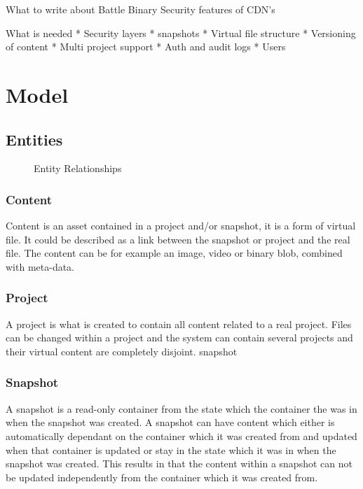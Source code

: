 \documentclass[a4paper,12pt]{article}
\begin{document}
What to write about
Battle Binary
Security features of CDN's

What is needed
* Security layers
* snapshots
* Virtual file structure
* Versioning of content
* Multi project support
* Auth and audit logs
* Users
\newpage 
\section{Model}
\subsection{Entities}
\begin{figure}[htp] 
    \caption{Entity Relationships}
    \label{fig:relation}
\end{figure}

\subsubsection{Content}
Content is an asset contained in a project and/or snapshot, it is a form of virtual file.
It could be described as a link between the snapshot or project and the real file. 
The content can be for example an image, video or binary blob, combined with meta-data.

\subsubsection{Project}
A project is what is created to contain all content related to a real project. Files can be changed within a project and 
the system can contain several projects and their virtual content are completely disjoint.
snapshot
\subsubsection{Snapshot}
A snapshot is a read-only container from the state which the container the was in when the snapshot was created. A snapshot can 
have content which either is automatically dependant on the container which it was created from and updated when that container 
is updated or stay in the state which it was in when the snapshot was created. This results in that the content within a snapshot 
can not be updated independently from the container which it was created from.
\end{document}

